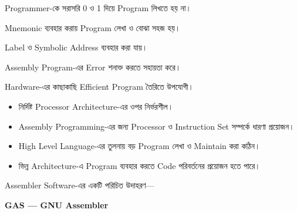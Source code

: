 
\begin{compacttwocolpoints}

\item Programmer-কে সরাসরি 0 ও 1 দিয়ে Program লিখতে হয় না।

\item Mnemonic ব্যবহার করায় Program লেখা ও বোঝা সহজ হয়।

\item Label ও Symbolic Address ব্যবহার করা যায়।

\item Assembly Program-এর Error শনাক্ত করতে সহায়তা করে।

\item Hardware-এর কাছাকাছি Efficient Program তৈরিতে উপযোগী।

\end{compacttwocolpoints}


\begin{itemize}

\item নির্দিষ্ট Processor Architecture-এর ওপর নির্ভরশীল।

\item Assembly Programming-এর জন্য Processor ও Instruction Set
সম্পর্কে ধারণা প্রয়োজন।

\item High Level Language-এর তুলনায় বড় Program লেখা ও Maintain
করা কঠিন।

\item ভিন্ন Architecture-এ Program ব্যবহার করতে Code পরিবর্তনের
প্রয়োজন হতে পারে।

\end{itemize}


Assembler Software-এর একটি পরিচিত উদাহরণ—

\begin{center}

\textbf{GAS — GNU Assembler}

\end{center}

